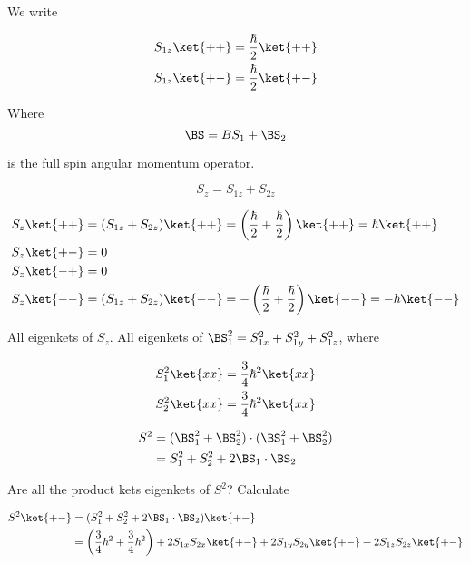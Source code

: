 We write

\begin{align}\label{eqn:qmTwoL16:n}
S_{1z}\ket{++} &= \frac{\hbar}{2} \ket{++} \\
S_{1z}\ket{+-} &= \frac{\hbar}{2} \ket{+-}
\end{align}

Where
\begin{equation}\label{eqn:qmTwoL16:n}
\BS = BS_1 + \BS_2
\end{equation}

is the full spin angular momentum operator.

\begin{equation}\label{eqn:qmTwoL16:n}
S_z = S_{1z} + S_{2z}
\end{equation}

\begin{align}\label{eqn:qmTwoL16:n}
S_z\ket{++} &= (S_{1z} + S_{2z}) \ket{++} = \left( \frac{\hbar}{2} +\frac{\hbar}{2} \right) \ket{++} = \hbar \ket{++} \\ 
S_z\ket{+-} &= 0 \\
S_z\ket{-+} &= 0 \\
S_z\ket{--} &= (S_{1z} + S_{2z}) \ket{--} = -\left( \frac{\hbar}{2} +\frac{\hbar}{2} \right) \ket{--} = -\hbar \ket{--} 
\end{align}

All eigenkets of $S_z$.  All eigenkets of $\BS_1^2 = S_{1x}^2 +S_{1y}^2 +S_{1z}^2$, where

\begin{align}\label{eqn:qmTwoL16:n}
S_1^2 \ket{x x} &= \frac{3}{4} \hbar^2 \ket{x x} \\
S_2^2 \ket{x x} &= \frac{3}{4} \hbar^2 \ket{x x}
\end{align}

\begin{equation}\label{eqn:qmTwoL16:n}
\begin{aligned}
S^2 &= 
(\BS_1^2
+\BS_2^2) 
\cdot
(\BS_1^2
+\BS_2^2)  \\
&= 
S_1^2 + S_2^2 + 2 \BS_1 \cdot \BS_2
\end{aligned}
\end{equation}

Are all the product kets eigenkets of $S^2$?  Calculate

\begin{align*}
S^2 \ket{+-} 
&= 
(S_1^2 + S_2^2 + 2 \BS_1 \cdot \BS_2) \ket{+-} \\
&=
\left(\frac{3}{4}\hbar^2
+\frac{3}{4}\hbar^2\right)
+ 2 S_{1x} S_{2x} \ket{+-} 
+ 2 S_{1y} S_{2y} \ket{+-} 
+ 2 S_{1z} S_{2z} \ket{+-} 
\end{align*}

